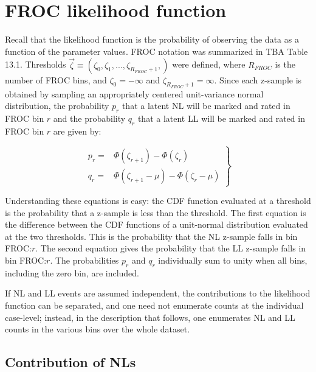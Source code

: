 \documentclass[
]{book}
\begin{document}
\hypertarget{rsm-fitting-froc-likelihood}{%
\section{FROC likelihood function}\label{rsm-fitting-froc-likelihood}}

Recall that the likelihood function is the probability of observing the data as a function of the parameter values. FROC notation was summarized in TBA Table 13.1. Thresholds \(\overrightarrow{\zeta } \equiv \left ( \zeta_0, \zeta_1, ..., \zeta_{R_{FROC}+1}, \right )\) were defined, where \(R_{FROC}\) is the number of FROC bins, and \(\zeta_0 = -\infty\) and \(\zeta_{R_{FROC}+1} = \infty\). Since each z-sample is obtained by sampling an appropriately centered unit-variance normal distribution, the probability \(p_r\) that a latent NL will be marked and rated in FROC bin \(r\) and the probability \(q_r\) that a latent LL will be marked and rated in FROC bin \(r\) are given by:

\begin{equation}
\left. 
\begin{aligned}
p_r = & \Phi\left ( \zeta_{r+1} \right ) - \Phi\left ( \zeta_r \right ) \\
q_r = & \Phi\left ( \zeta_{r+1} - \mu \right ) - \Phi\left ( \zeta_r  - \mu \right ) 
\end{aligned}
\right \}
\label{eq:rsm-fitting-pr-qr}
\end{equation}

Understanding these equations is easy: the CDF function evaluated at a threshold is the probability that a z-sample is less than the threshold. The first equation is the difference between the CDF functions of a unit-normal distribution evaluated at the two thresholds. This is the probability that the NL z-sample falls in bin FROC:\(r\). The second equation gives the probability that the LL z-sample falls in bin FROC:\(r\). The probabilities \(p_r\) and \(q_r\) individually sum to unity when all bins, including the zero bin, are included.

If NL and LL events are assumed independent, the contributions to the likelihood function can be separated, and one need not enumerate counts at the individual case-level; instead, in the description that follows, one enumerates NL and LL counts in the various bins over the whole dataset.

\hypertarget{rsm-fitting-froc-nls}{%
\subsection{Contribution of NLs}\label{rsm-fitting-froc-nls}}
\end{document}
